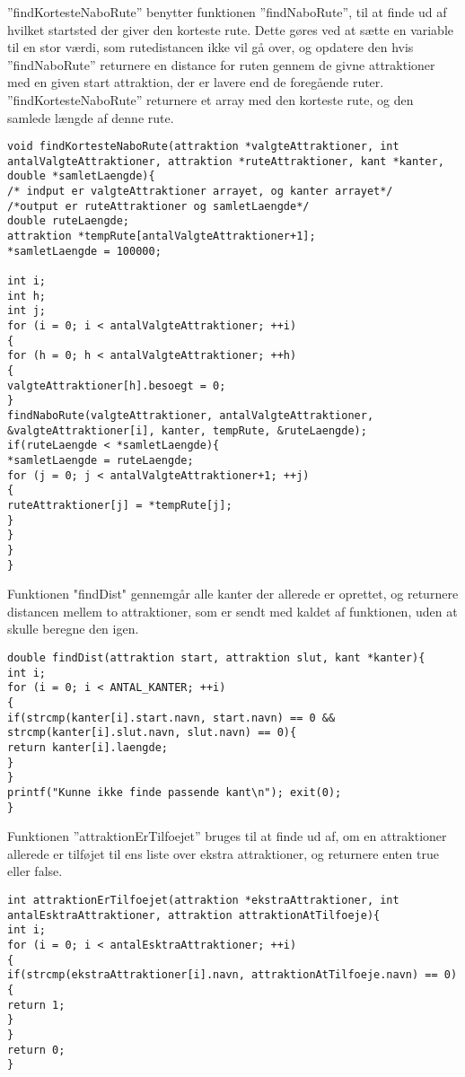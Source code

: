”findKortesteNaboRute” benytter funktionen ”findNaboRute”, til at finde ud af hvilket startsted der giver den korteste rute. Dette gøres ved at sætte en variable til en stor værdi, som rutedistancen ikke vil gå over, og opdatere den hvis ”findNaboRute” returnere en distance for ruten gennem de givne attraktioner med en given start attraktion, der er lavere end de foregående ruter. ”findKortesteNaboRute” returnere et array med den korteste rute, og den samlede længde af denne rute.  \newline

\begin{lstlisting}
void findKortesteNaboRute(attraktion *valgteAttraktioner, int antalValgteAttraktioner, attraktion *ruteAttraktioner, kant *kanter, double *samletLaengde){
/* indput er valgteAttraktioner arrayet, og kanter arrayet*/
/*output er ruteAttraktioner og samletLaengde*/
double ruteLaengde;
attraktion *tempRute[antalValgteAttraktioner+1];
*samletLaengde = 100000;

int i;
int h;
int j;
for (i = 0; i < antalValgteAttraktioner; ++i)
{
for (h = 0; h < antalValgteAttraktioner; ++h)
{
valgteAttraktioner[h].besoegt = 0;
}
findNaboRute(valgteAttraktioner, antalValgteAttraktioner, &valgteAttraktioner[i], kanter, tempRute, &ruteLaengde);
if(ruteLaengde < *samletLaengde){
*samletLaengde = ruteLaengde;
for (j = 0; j < antalValgteAttraktioner+1; ++j)
{
ruteAttraktioner[j] = *tempRute[j];
}
}
}
}
\end{lstlisting}

Funktionen "findDist" gennemgår alle kanter der allerede er oprettet, og returnere distancen mellem to attraktioner, som er sendt med kaldet af funktionen, uden at skulle beregne den igen. \newline

\begin{lstlisting}
double findDist(attraktion start, attraktion slut, kant *kanter){
int i;
for (i = 0; i < ANTAL_KANTER; ++i)
{
if(strcmp(kanter[i].start.navn, start.navn) == 0 && strcmp(kanter[i].slut.navn, slut.navn) == 0){
return kanter[i].laengde;
}
}
printf("Kunne ikke finde passende kant\n"); exit(0);
}
\end{lstlisting}

Funktionen ”attraktionErTilfoejet” bruges til at finde ud af, om en attraktioner allerede er tilføjet til ens liste over ekstra attraktioner, og returnere enten true eller false. \newline

\begin{lstlisting}
int attraktionErTilfoejet(attraktion *ekstraAttraktioner, int antalEsktraAttraktioner, attraktion attraktionAtTilfoeje){
int i;
for (i = 0; i < antalEsktraAttraktioner; ++i)
{
if(strcmp(ekstraAttraktioner[i].navn, attraktionAtTilfoeje.navn) == 0){
return 1;
}
}
return 0;
}
\end{lstlisting}

